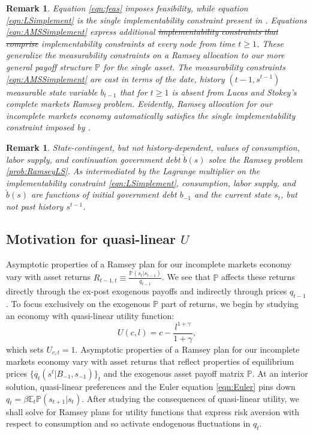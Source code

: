 \documentclass[12pt]{article}
\newtheorem{remark}[theorem]{Remark}
\begin{document}
\begin{remark} Equation \eqref{eqn:feas} imposes feasibility, while equation  \eqref{eqn:LSimplement} is the single implementability constraint
present in \citet{LucasJr.1983}.  Equations \eqref{eqn:AMSSimplement} express  additional \st{implementability constraints that comprise} implementability constraints at every node from time $t \geq 1$. These generalize the \citet{Aiyagari2002} measurability constraints on a Ramsey allocation  to our more general payoff structure ${\mathbb P}$ for the
single asset. The measurability constraints \eqref{eqn:AMSSimplement}  are cast
in terms of the date, history $(t-1, s^{t-1})$ measurable state variable $b_{t-1}$ that for $t \geq 1$ is absent from Lucas and Stokey's complete markets Ramsey problem.  Evidently, Ramsey allocation for our incomplete markets economy automatically satisfies the single implementability constraint imposed by \citeauthor{LucasJr.1983}.
\end{remark}


\begin{remark}\label{rem:LSdebt}
State-contingent, but not history-dependent,  values of consumption, labor supply, and continuation government debt $\check b(s)$ solve the \citet{LucasJr.1983} Ramsey problem \ref{prob:RamseyLS}.  As intermediated by the Lagrange multiplier on the implementability constraint \eqref{eqn:LSimplement},
consumption, labor supply, and $\check b(s)$ are  functions of initial government debt $b_{-1}$ and the current state $s_t$, but not past history $s^{t-1}$.
\end{remark}

\subsection{Motivation for  quasi-linear $U$\label{sec:excusequasilinear}}
Asymptotic properties of a Ramsey plan for our incomplete markets economy vary  with asset returns $R_{t-1,t}\equiv \frac{\mathbb{P}(s_{t}|s_{t-1})}{q_{t-1}}$. We see that $\mathbb{P}$ affects these returns directly through the ex-post exogenous payoffs and indirectly through prices $q_{t-1}$. To focus exclusively on the exogenous $\mathbb{P}$ part of returns, we begin  by studying an economy with  quasi-linear  utility function:
  \begin{equation}\label{eqn:UQL}
U(c,l)=c-\frac{l^{1+\gamma}}{1+\gamma},\end{equation} which sets $U_{c,t}= 1$.  Asymptotic properties of a Ramsey plan for our incomplete markets economy vary  with   asset returns that reflect
	properties of equilibrium prices $\{q_t(s^t|B_{-1},s_{-1})\}_t$ and the exogenous asset payoff matrix $\mathbb{P}$.
At an interior solution, quasi-linear preferences and the Euler equation \eqref{eqn:Euler} pins down $q_t=\beta \mathbb{E}_t
\mathbb{P}(s_{t+1}|s_t)$.  After studying the consequences of quasi-linear utility, we shall solve for Ramsey plans for utility functions that express risk aversion with respect to consumption and so activate endogenous fluctuations in $q_t$.
	
\end{document}
